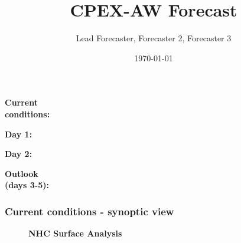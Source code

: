 \documentclass[aspectratio=169, 10pt]{beamer}
\title{CPEX-AW Forecast \vspace{-1cm}}
\author{Lead Forecaster, Forecaster 2, Forecaster 3\vspace{-1cm}}
\date{{\AdvanceDate[0]\today}\vspace{-1cm}}
\begin{document}
\begin{frame}
\vspace{-3cm}
\vspace{-.2cm}
\textbf{Current \\conditions:}

\vspace{.5cm}
\textbf{Day 1:}

\vspace{.5cm}
\textbf{Day 2:}

\vspace{.5cm}
\textbf{Outlook \\(days 3-5):}

\vspace{-1.5cm}
\end{frame}




\begin{frame}
\vspace{-1cm}
\frametitle{Current conditions - synoptic view}

\begin{figure} [htbp]
\begin{center}
\vspace{.6cm}
\textbf{NHC Surface Analysis}
\end{center}
\end{figure}

\end{frame}
\end{document}
